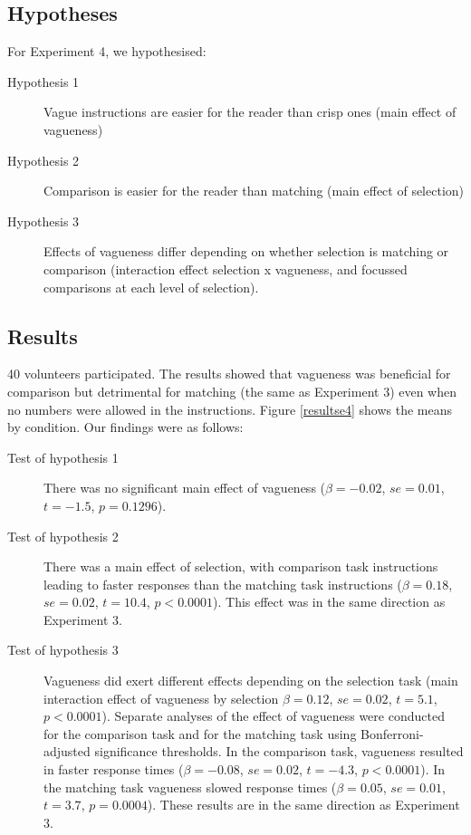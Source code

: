 \subsection{Hypotheses}%
\noindent For Experiment 4, we hypothesised:

\begin{description}
	\item [Hypothesis 1] Vague instructions are easier for the reader than crisp ones (main effect of vagueness)
	\item [Hypothesis 2] Comparison is easier for the reader than matching (main effect of selection)
	\item [Hypothesis 3] Effects of vagueness differ depending on whether selection is matching or comparison (interaction effect selection x vagueness, and focussed comparisons at each level of selection).
\end{description}

\subsection{Results}%
40 volunteers participated.
The results showed that vagueness was beneficial for comparison but detrimental for matching (the same as Experiment 3) even when no numbers were allowed in the instructions. 
Figure \ref{resultse4} shows the means by condition. Our findings were as follows:

\begin{description}
	\item [Test of hypothesis 1] There was no significant main effect of vagueness ($\beta=-0.02$, $se=0.01$, $t=-1.5$, $p=0.1296$). 
	\item [Test of hypothesis 2] There was a main effect of selection, with comparison task instructions leading to faster responses than the matching task instructions ($\beta=0.18$, $se=0.02$, $t=10.4$, $p<0.0001$).  This effect was in the same direction as Experiment 3. 
	\item [Test of hypothesis 3] Vagueness did exert different effects depending on the selection task (main interaction effect of vagueness by selection $\beta=0.12$, $se=0.02$, $t=5.1$, $p<0.0001$). 
Separate analyses of the effect of vagueness were conducted for the comparison task and for the matching task using Bonferroni-adjusted significance thresholds. 
In the comparison task, vagueness resulted in faster response times ($\beta=-0.08$, $se=0.02$, $t=-4.3$, $p<0.0001$). 
In the matching task vagueness slowed response times ($\beta=0.05$, $se=0.01$, $t=3.7$, $p=0.0004$). 
These results are in the same direction as Experiment 3.
\end{description}

